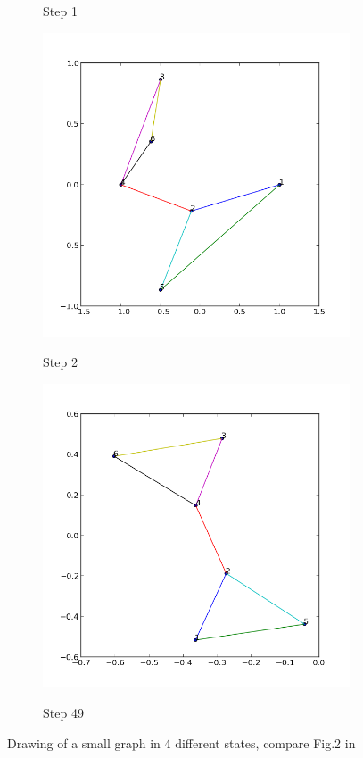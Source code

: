 \documentclass[12pt,a4paper]{article}
\begin{document}
\begin{figure}
\begin{subfigure}{.5\textwidth}
			\caption{Step 1}
			\end{subfigure}
			\begin{subfigure}{.5\textwidth}
			\centering
			\includegraphics[scale=0.45]{results_Kawai/ex1p2}\\
			\caption{Step 2}
			\end{subfigure}\hfill
			\begin{subfigure}{.5\textwidth}
			\centering
			\includegraphics[scale=0.45]{results_Kawai/ex1p49}\\
			\caption{Step 49}
			\end{subfigure}\hfill

		\caption{Drawing of a small graph in 4 different states, compare Fig.2 in \cite{TomihisaKamada1989}}\label{fig: 1}
\end{figure}
\end{document}
